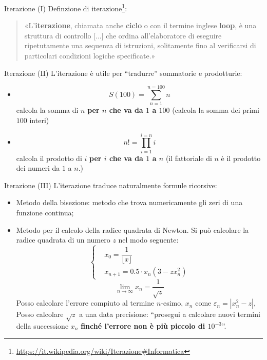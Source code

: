 \begin{frame}{Iterazione (I)}
  Definzione di iterazione\footnote{\url{https://it.wikipedia.org/wiki/Iterazione\#Informatica}}:
  \begin{quote}
    «L'\textbf{iterazione}, chiamata anche \textbf{ciclo} o con il termine inglese \textbf{loop}, 
    è una struttura di controllo [...]  che ordina all'elaboratore di eseguire ripetutamente 
    una sequenza di istruzioni, solitamente fino al verificarsi di particolari condizioni logiche specificate.»
  \end{quote}
\end{frame}

\begin{frame}{Iterazione (II)}
  L'iterazione è utile per ``tradurre'' sommatorie e prodotturie:
  \begin{itemize}
   \item \[S(100) = \sum_{n=1}^{n=100} n\]
	 calcola la somma di $n$ \textbf{per $n$ che va da  $1$ a $100$}
	 (calcola la somma dei primi $100$ interi)
   \item \[n! = \prod_{i=1}^{i=n} i\]
	 calcola il prodotto di $i$ \textbf{per $i$ che va da  $1$ a $n$}
	 (il fattoriale di $n$ \`e il prodotto dei numeri da $1$ a $n$.)
  \end{itemize}

\end{frame}

\begin{frame}{Iterazione (III)}
  L'iterazione traduce naturalmente formule ricorsive:
  \begin{itemize}
    \item Metodo della bisezione: metodo che trova numericamente gli zeri di una funzione continua;

    \item Metodo per il calcolo della radice quadrata di Newton.
    Si può calcolare la radice quadrata di un numero $z$ nel modo seguente:
    \begin{equation*}
      \left\{\begin{aligned}
	  & x_0 = \dfrac{1}{\lfloor x \rfloor} \\
	  & x_{n +1} = 0.5 \cdot {x_n} (3  - zx^2_n)
      \end{aligned}\right.
    \end{equation*}
    \begin{equation*}
     \lim_{n \to \infty} x_{n} = \dfrac{1}{\sqrt{z}}
    \end{equation*}
    Posso calcolare l'errore compiuto al termine $n$-esimo, $x_{n}$ come $\varepsilon_{n} = |x^{2}_{n} - z|$,
    Posso calcolare $\sqrt{z}$ a una data precisione: ``prosegui a calcolare nuovi termini della successione $x_{n}$
    \textbf{finché l'errore non è più piccolo di $10^{-3}$}''.


  \end{itemize}

\end{frame}

